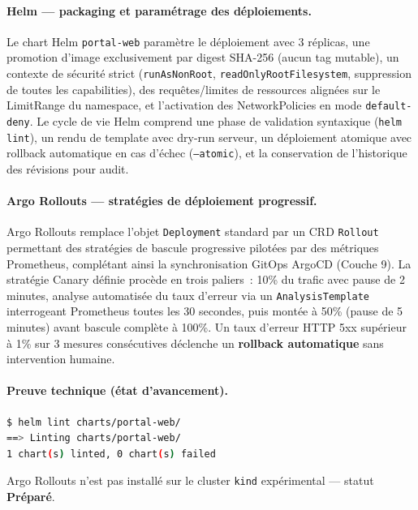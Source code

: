 \paragraph{Helm — packaging et paramétrage des déploiements.}
Le chart Helm \texttt{portal-web} paramètre le déploiement avec 3 réplicas, une promotion d'image exclusivement par digest SHA-256 (aucun tag mutable), un contexte de sécurité strict (\texttt{runAsNonRoot}, \texttt{readOnlyRootFilesystem}, suppression de toutes les capabilities), des requêtes/limites de ressources alignées sur le LimitRange du namespace, et l'activation des NetworkPolicies en mode \texttt{default-deny}. Le cycle de vie Helm comprend une phase de validation syntaxique (\texttt{helm lint}), un rendu de template avec dry-run serveur, un déploiement atomique avec rollback automatique en cas d'échec (\texttt{--atomic}), et la conservation de l'historique des révisions pour audit.

\paragraph{Argo Rollouts — stratégies de déploiement progressif.}
Argo Rollouts remplace l'objet \texttt{Deployment} standard par un CRD \texttt{Rollout} permettant des stratégies de bascule progressive pilotées par des métriques Prometheus, complétant ainsi la synchronisation GitOps ArgoCD (Couche 9). La stratégie Canary définie procède en trois paliers~: 10\% du trafic avec pause de 2 minutes, analyse automatisée du taux d'erreur via un \texttt{AnalysisTemplate} interrogeant Prometheus toutes les 30 secondes, puis montée à 50\% (pause de 5 minutes) avant bascule complète à 100\%. Un taux d'erreur HTTP 5xx supérieur à 1\% sur 3 mesures consécutives déclenche un \textbf{rollback automatique} sans intervention humaine.

\paragraph{Preuve technique (état d'avancement).}
\begin{lstlisting}[language=bash, caption={Validation locale du chart Helm (dry-run)}, label={lst:helm_dryrun_proof}]
$ helm lint charts/portal-web/
==> Linting charts/portal-web/
1 chart(s) linted, 0 chart(s) failed
\end{lstlisting}

Argo Rollouts n'est pas installé sur le cluster \texttt{kind} expérimental — statut \textbf{Préparé}.


